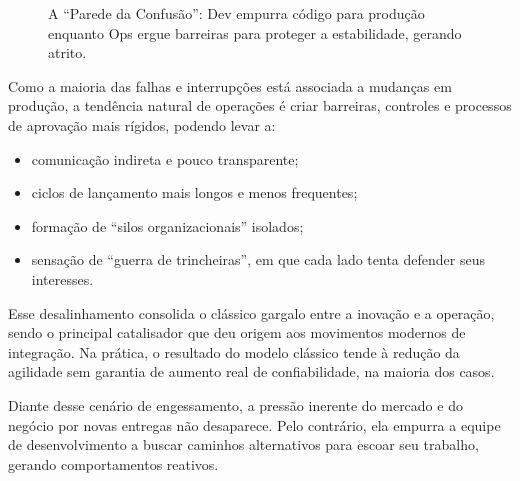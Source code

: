 \documentclass[12pt,a4paper,twoside]{report}
\begin{document}
\begin{figure}[h]
    \caption{A ``Parede da Confusão'': Dev empurra código para produção enquanto Ops ergue barreiras para proteger a estabilidade, gerando atrito.}
    \label{fig:parede-confusao}
\end{figure}

Como a maioria das falhas e interrupções está associada a mudanças em
produção, a tendência natural de operações é criar barreiras, controles e
processos de aprovação mais rígidos, podendo levar a:
\begin{itemize}[nosep]
    \item comunicação indireta e pouco transparente;
    \item ciclos de lançamento mais longos e menos frequentes;
    \item formação de ``silos organizacionais'' isolados;
    \item sensação de ``guerra de trincheiras'', em que cada lado tenta
    defender seus interesses.
\end{itemize}

Esse desalinhamento consolida o clássico gargalo entre a inovação e a operação, sendo o principal catalisador que deu origem aos movimentos modernos de integração. Na prática, o resultado do modelo clássico tende à redução da agilidade sem garantia de aumento real de confiabilidade, na maioria dos casos.

Diante desse cenário de engessamento, a pressão inerente do mercado e do negócio por novas entregas não desaparece. Pelo contrário, ela empurra a equipe de desenvolvimento a buscar caminhos alternativos para escoar seu trabalho, gerando comportamentos reativos.
\end{document}
